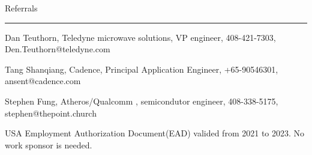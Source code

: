 { \medbreak } { \FFbg
Referrals
}
{ \smallbreak } {\par\noindent\hrule} { \smallbreak }

Dan Teuthorn, 
Teledyne microwave solutions, VP engineer,
408-421-7303,
Den.Teuthorn@teledyne.com

Tang Shanqiang,
Cadence,
Principal Application Engineer,
+65-90546301,
ansent@cadence.com

Stephen Fung,
Atheros/Qualcomm , semicondutor engineer,
408-338-5175,
stephen@thepoint.church



{ \medbreak } 
{ %
USA Employment Authorization Document(EAD) valided from 2021 to 2023.
No work sponsor is needed.
}

\break

\bye

